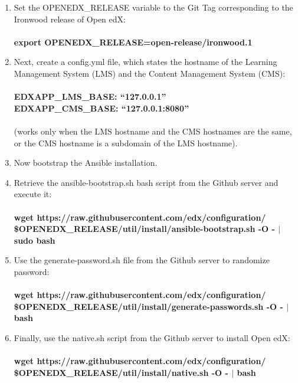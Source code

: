 \documentclass[12pt]{report}
\begin{document}
\begin{enumerate}
	\item Set the OPENEDX\_RELEASE variable to the Git Tag corresponding to the Ironwood release of Open edX:\\\\
	\textbf{export OPENEDX\_RELEASE=open-release/ironwood.1}
	\item Next, create a config.yml file, which states the hostname of the Learning Management System (LMS) and the Content Management System (CMS):\\\\
	\textbf{EDXAPP\_LMS\_BASE: “127.0.0.1”}\\
	\textbf{EDXAPP\_CMS\_BASE: “127.0.0.1:8080”}\\\\
	(works only when the LMS hostname and the CMS hostnames are the same, or the CMS hostname is a subdomain of the LMS hostname).
	\item Now bootstrap the Ansible installation.
	\item Retrieve the ansible-bootstrap.sh bash script from the Github server and execute it:\\\\
	\textbf{wget https://raw.githubusercontent.com/edx/configuration/\\ \$OPENEDX\_RELEASE/util/install/ansible-bootstrap.sh -O - $|$ sudo bash}
	\item Use the generate-password.sh file from the Github server to randomize password:\\\\
	\textbf{wget https://raw.githubusercontent.com/edx/configuration/\\ \$OPENEDX\_RELEASE/util/install/generate-passwords.sh -O - $|$ bash}
	\item Finally, use the native.sh script from the Github server to install Open edX:\\\\
	\textbf{wget https://raw.githubusercontent.com/edx/configuration/\\ \$OPENEDX\_RELEASE/util/install/native.sh -O - $|$ bash}
	
\end{enumerate}
\end{document}

